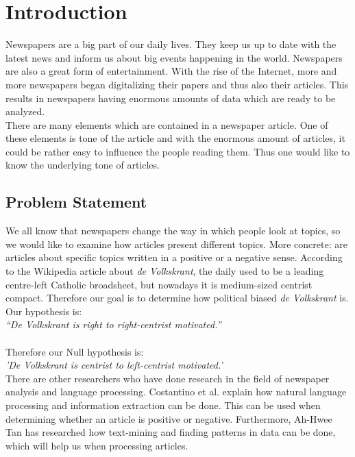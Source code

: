 \section{Introduction}
Newspapers are a big part of our daily lives. They keep us up to date with the latest news and inform us about big events happening in the world\cite{hurricanes:newspaper}. Newspapers are also a great form of entertainment. With the rise of the Internet, more and more newspapers began digitalizing their papers and thus also their articles. This results in newspapers having enormous amounts of data which are ready to be analyzed. \\

There are many elements which are contained in a newspaper article. One of these elements is tone of the article and with the enormous amount of articles, it could be rather easy to influence the people\cite{media:coverage} reading them. Thus one would like to know the underlying tone of articles.

\subsection{Problem Statement}
We all know that newspapers change the way in which people look at topics, so we would like to examine how articles present different topics. More concrete: are articles about specific topics written in a positive or a negative sense. According to the Wikipedia article about {\it de Volkskrant}\cite{volkskrant_wiki}, the daily used to be a leading centre-left Catholic broadsheet, but nowadays it is medium-sized centrist compact. Therefore our goal is to determine how political biased {\it de Volkskrant} is. \\
Our hypothesis is: \\

\textit{“De Volkskrant is right to right-centrist motivated.”}\\\\
Therefore our Null hypothesis is:\\

\textit{'De Volkskrant is centrist to left-centrist motivated.'}\\

There are other researchers who have done research in the field of newspaper analysis and language processing. Costantino et al.\cite{qualitativeinformation} explain how natural language processing and information extraction can be done. This can be used when determining whether an article is positive or negative. Furthermore, Ah-Hwee Tan has researched how text-mining and finding patterns in data can be done\cite{textmining}, which will help us when processing articles.\\

